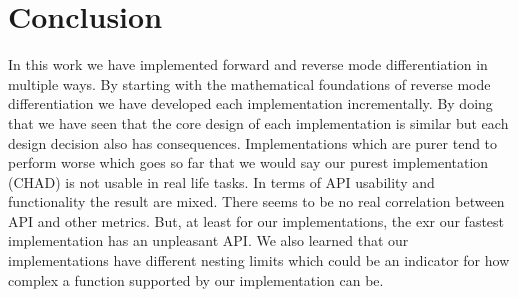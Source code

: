 \chapter{Conclusion}
In this work we have implemented forward and reverse mode differentiation in multiple ways. By starting with the mathematical foundations of reverse mode differentiation we have developed each implementation incrementally. By doing that we have seen that the core design of each implementation is similar but each design decision also has consequences. Implementations which are purer tend to perform worse which goes so far that we would say our purest implementation (CHAD) is not usable in real life tasks. In terms of API usability and functionality the result are mixed. There seems to be no real correlation between API and other metrics. But, at least for our implementations, the exr our fastest implementation has an unpleasant API. We also learned that our implementations have different nesting limits which could be an indicator for how complex a function supported by our implementation can be.